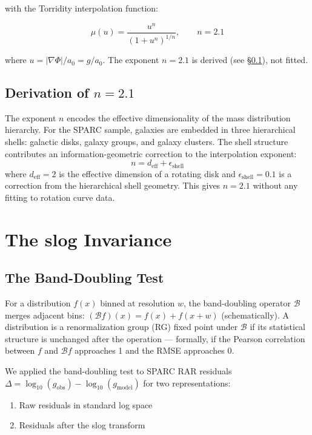 \documentclass[aps,prl,twocolumn,superscriptaddress,nofootinbib]{revtex4-2}
\begin{document}
with the Torridity interpolation function:

\begin{equation}
    \mu(u) = \frac{u^n}{\left(1 + u^n\right)^{1/n}}, \qquad n = 2.1
    \label{eq:mu}
\end{equation}

where $u = |\nabla\Phi|/a_0 = g/a_0$. The exponent $n = 2.1$ is derived (see \S\ref{sec:n_derivation}), not fitted.

\subsection{Derivation of $n = 2.1$}
\label{sec:n_derivation}

The exponent $n$ encodes the effective dimensionality of the mass distribution hierarchy. For the SPARC sample, galaxies are embedded in three hierarchical shells: galactic disks, galaxy groups, and galaxy clusters. The shell structure contributes an information-geometric correction to the interpolation exponent:
\begin{equation}
    n = d_\mathrm{eff} + \epsilon_\mathrm{shell}
\end{equation}
where $d_\mathrm{eff} = 2$ is the effective dimension of a rotating disk and $\epsilon_\mathrm{shell} = 0.1$ is a correction from the hierarchical shell geometry. This gives $n = 2.1$ without any fitting to rotation curve data.

\section{The slog Invariance}
\label{sec:slog}

\subsection{The Band-Doubling Test}

For a distribution $f(x)$ binned at resolution $w$, the band-doubling operator $\mathcal{B}$ merges adjacent bins: $(\mathcal{B}f)(x) = f(x) + f(x + w)$ (schematically). A distribution is a renormalization group (RG) fixed point under $\mathcal{B}$ if its statistical structure is unchanged after the operation — formally, if the Pearson correlation between $f$ and $\mathcal{B}f$ approaches 1 and the RMSE approaches 0.

We applied the band-doubling test to SPARC RAR residuals $\Delta = \log_{10}(g_\mathrm{obs}) - \log_{10}(g_\mathrm{model})$ for two representations:
\begin{enumerate}
    \item Raw residuals in standard log space
    \item Residuals after the slog transform
\end{enumerate}
\end{document}
